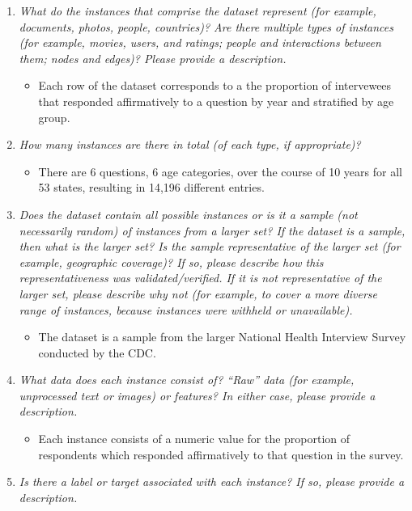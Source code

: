 \documentclass[
]{article}
\providecommand{\tightlist}{%
  \setlength{\itemsep}{0pt}\setlength{\parskip}{0pt}}
\begin{document}
\begin{enumerate}
\def\labelenumi{\arabic{enumi}.}
\tightlist
\item
  \emph{What do the instances that comprise the dataset represent (for
  example, documents, photos, people, countries)? Are there multiple
  types of instances (for example, movies, users, and ratings; people
  and interactions between them; nodes and edges)? Please provide a
  description.}

  \begin{itemize}
  \tightlist
  \item
    Each row of the dataset corresponds to a the proportion of
    intervewees that responded affirmatively to a question by year and
    stratified by age group.
  \end{itemize}
\item
  \emph{How many instances are there in total (of each type, if
  appropriate)?}

  \begin{itemize}
  \tightlist
  \item
    There are 6 questions, 6 age categories, over the course of 10 years
    for all 53 states, resulting in 14,196 different entries.
  \end{itemize}
\item
  \emph{Does the dataset contain all possible instances or is it a
  sample (not necessarily random) of instances from a larger set? If the
  dataset is a sample, then what is the larger set? Is the sample
  representative of the larger set (for example, geographic coverage)?
  If so, please describe how this representativeness was
  validated/verified. If it is not representative of the larger set,
  please describe why not (for example, to cover a more diverse range of
  instances, because instances were withheld or unavailable).}

  \begin{itemize}
  \tightlist
  \item
    The dataset is a sample from the larger National Health Interview
    Survey conducted by the CDC.
  \end{itemize}
\item
  \emph{What data does each instance consist of? ``Raw'' data (for
  example, unprocessed text or images) or features? In either case,
  please provide a description.}

  \begin{itemize}
  \tightlist
  \item
    Each instance consists of a numeric value for the proportion of
    respondents which responded affirmatively to that question in the
    survey.
  \end{itemize}
\item
  \emph{Is there a label or target associated with each instance? If so,
  please provide a description.}


\end{enumerate}
\end{document}
